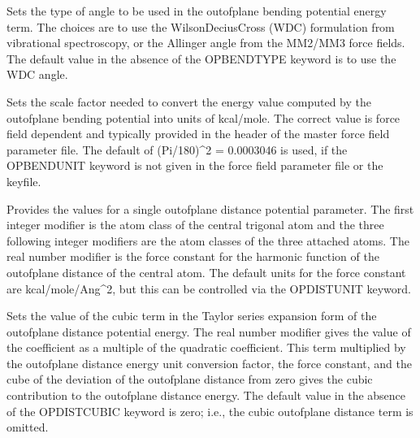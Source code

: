 \documentclass[letterpaper,11pt,english]{sphinxmanual}
\begin{document}
  Sets the type of angle to be used in the out\sphinxhyphen{}of\sphinxhyphen{}plane bending potential energy term. The choices are to use the Wilson\sphinxhyphen{}Decius\sphinxhyphen{}Cross (W\sphinxhyphen{}D\sphinxhyphen{}C) formulation from vibrational spectroscopy, or the Allinger angle from the MM2/MM3 force fields. The default value in the absence of the OPBENDTYPE keyword is to use the W\sphinxhyphen{}D\sphinxhyphen{}C angle.

  Sets the scale factor needed to convert the energy value computed by the out\sphinxhyphen{}of\sphinxhyphen{}plane bending potential into units of kcal/mole. The correct value is force field dependent and typically provided in the header of the master force field parameter file. The default of (Pi/180)\textasciicircum{}2 = 0.0003046 is used, if the OPBENDUNIT keyword is not given in the force field parameter file or the keyfile.

  Provides the values for a single out\sphinxhyphen{}of\sphinxhyphen{}plane distance potential parameter. The first integer modifier is the atom class of the central trigonal atom and the three following integer modifiers are the atom classes of the three attached atoms. The real number modifier is the force constant for the harmonic function of the out\sphinxhyphen{}of\sphinxhyphen{}plane distance of the central atom. The default units for the force constant are kcal/mole/Ang\textasciicircum{}2, but this can be controlled via the OPDISTUNIT keyword.

  Sets the value of the cubic term in the Taylor series expansion form of the out\sphinxhyphen{}of\sphinxhyphen{}plane distance potential energy. The real number modifier gives the value of the coefficient as a multiple of the quadratic coefficient. This term multiplied by the out\sphinxhyphen{}of\sphinxhyphen{}plane distance energy unit conversion factor, the force constant, and the cube of the deviation of the out\sphinxhyphen{}of\sphinxhyphen{}plane distance from zero gives the cubic contribution to the out\sphinxhyphen{}of\sphinxhyphen{}plane distance energy. The default value in the absence of the OPDIST\sphinxhyphen{}CUBIC keyword is zero; i.e., the cubic out\sphinxhyphen{}of\sphinxhyphen{}plane distance term is omitted.
\end{document}
